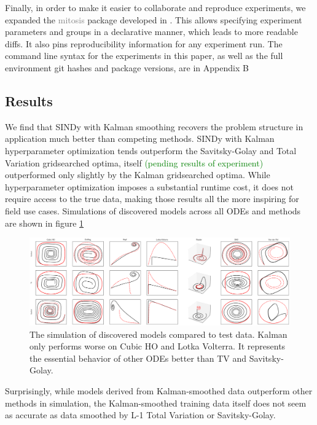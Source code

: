 \documentclass{article}
\newcommand{\gray}[1]{\textcolor{gray}{#1}}
\newcommand{\green}[1]{\textcolor{green}{#1}}
\begin{document}
Finally, in order to make it easier to collaborate and reproduce experiments, we expanded the \gray{mitosis} package developed in \cite{Stevens-Haas2022}.  This allows specifying experiment parameters and groups in a declarative manner, which leads to more readable diffs.  It also pins reproducibility information for any experiment run.  The command line syntax for the experiments in this paper, as well as the full environment git hashes and package versions, are in Appendix B

\subsection{Results}

We find that SINDy with Kalman smoothing recovers the problem structure in application much better than competing methods.  SINDy with Kalman hyperparameter optimization tends outperform the Savitsky-Golay and Total Variation gridsearched optima, itself \green{(pending results of experiment)} outperformed only slightly by the Kalman gridsearched optima.  While hyperparameter optimization imposes a substantial runtime cost, it does not require access to the true data, making those results all the more inspiring for field use cases.  Simulations of discovered models across all ODEs and methods are shown in figure \ref{fig:test}
\begin{figure}[h]
    \label{fig:test}
    \includegraphics[width=\textwidth]{images/summary_test}
    \caption{The simulation of discovered models compared to test data.  Kalman only performs worse on Cubic HO and Lotka Volterra.  It represents the essential behavior of other ODEs better than TV and Savitsky-Golay.}
\end{figure}

Surprisingly, while models derived from Kalman-smoothed data outperform other methods in simulation, the Kalman-smoothed training data itself does not seem as accurate as data smoothed by L-1 Total Variation or Savitsky-Golay.
\end{document}
